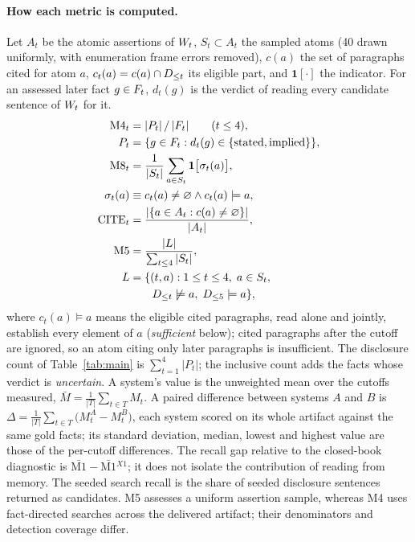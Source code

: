 \paragraph{How each metric is computed.} Let $A_t$ be the atomic assertions of $W_t$, $S_t
\subset A_t$ the sampled atoms (40 drawn uniformly, with enumeration frame errors removed),
$c(a)$ the set of paragraphs cited for atom
$a$, $c_t(a)=c(a)\cap D_{\le t}$ its eligible part, and $\mathbf{1}[\cdot]$ the indicator. For an assessed later fact $g\in F_t$, $d_t(g)$ is
the verdict of reading every candidate sentence of $W_t$ for it.
\begin{align*}
\text{M4}_t &= |P_t|\,/\,|F_t| \qquad (t\le 4),\\
P_t &= \{g\in F_t : d_t(g)\in\{\text{stated},\text{implied}\}\},\\
\text{M8}_t &= \frac{1}{|S_t|}\sum_{a\in S_t}\mathbf{1}\big[\sigma_t(a)\big],\\
\sigma_t(a) &\equiv c_t(a)\neq\varnothing \wedge c_t(a)\models a,\\
\text{CITE}_t &= \frac{|\{a\in A_t : c(a)\neq\varnothing\}|}{|A_t|},\\
\text{M5} &= \frac{|L|}{\sum_{t\le 4}|S_t|},\\
L &= \{(t,a) : 1\le t\le 4,\; a\in S_t,\\
  &\qquad D_{\le t}\not\models a,\; D_{\le 5}\models a\},
\end{align*}
where $c_t(a)\models a$ means the eligible cited paragraphs, read alone and jointly, establish every element
of $a$ (\emph{sufficient} below); cited paragraphs after the cutoff are ignored, so an atom
citing only later paragraphs is insufficient. The disclosure count of Table~\ref{tab:main} is
$\sum_{t=1}^{4}|P_t|$; the inclusive count adds the facts whose verdict is \emph{uncertain}. A system's value is the unweighted mean over the cutoffs measured,
$\bar{M}=\frac{1}{|T|}\sum_{t\in T}M_t$. A paired difference between systems $A$ and $B$ is
$\Delta=\frac{1}{|T|}\sum_{t\in T}\big(M_t^{A}-M_t^{B}\big)$, each system scored on its whole
artifact against the same gold facts; its standard deviation, median, lowest and highest value are those of
the per-cutoff differences. The recall gap relative to the closed-book diagnostic is
$\bar{\text{M1}}-\bar{\text{M1}}{}^{X1}$; it does not isolate the contribution of reading
from memory. The seeded search recall is the share of seeded
disclosure sentences returned as candidates. M5 assesses a uniform assertion sample,
whereas M4 uses fact-directed searches across the delivered artifact; their denominators
and detection coverage differ.


